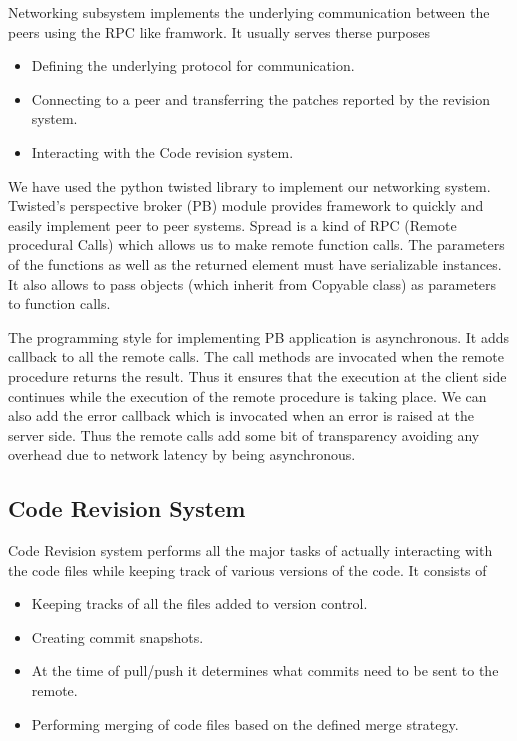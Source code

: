 \documentclass[12pt]{article}
\begin{document}
Networking subsystem implements the underlying communication between the
peers using the RPC like framwork. It usually serves therse purposes
\begin{itemize}
\item Defining the underlying protocol for communication.
\item Connecting to a peer and transferring the patches reported by the
  revision system.
\item Interacting with the Code revision system.
\end{itemize}
We have used the python twisted library to implement our networking
system. Twisted's perspective broker (PB) \cite{PB} module provides framework to quickly
and easily implement peer to peer systems. Spread is a kind of RPC (Remote
procedural Calls) which allows us to make remote function calls. The
parameters of the functions as well as the returned element must have
serializable instances. It also allows to pass objects (which inherit from
Copyable class) as parameters to function calls.

The programming style for implementing PB application is asynchronous. It
adds callback to all the remote calls. The call methods are invocated when the
remote procedure returns the result. Thus it ensures that the execution at the
client side continues while the execution of the remote procedure is taking
place. We can also add the error callback which is invocated when an error is
raised at the server side. Thus the remote calls add some bit of transparency
avoiding any overhead due to network latency by being asynchronous.

\pagebreak

\subsection{Code Revision System}

Code Revision system performs all the major tasks of actually interacting with
the code files while keeping track of various versions of the code. It consists of
\begin{itemize}
\item Keeping tracks of all the files added to version control.
\item Creating commit snapshots.
\item At the time of pull/push it determines what commits need to be sent to the remote.
\item Performing merging of code files based on the defined merge strategy.
\end{itemize}
\end{document}
